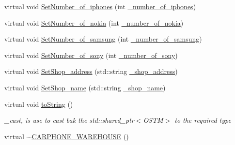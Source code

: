 \begin{DoxyCompactItemize}
\item 
virtual void \hyperlink{class_c_a_r_p_h_o_n_e___w_a_r_e_h_o_u_s_e_a167a9f9ac25b17395e5964b57099b462_a167a9f9ac25b17395e5964b57099b462}{Set\+Number\+\_\+of\+\_\+iphones} (int \hyperlink{class_c_a_r_p_h_o_n_e___w_a_r_e_h_o_u_s_e_af8f016cde9df0070da24fb8804f3d6ca_af8f016cde9df0070da24fb8804f3d6ca}{\+\_\+number\+\_\+of\+\_\+iphones})
\item 
virtual void \hyperlink{class_c_a_r_p_h_o_n_e___w_a_r_e_h_o_u_s_e_a5f2abf60f6fa8a614fadb1419bf1de83_a5f2abf60f6fa8a614fadb1419bf1de83}{Set\+Number\+\_\+of\+\_\+nokia} (int \hyperlink{class_c_a_r_p_h_o_n_e___w_a_r_e_h_o_u_s_e_a05e0c6f134857e06bdf9e6ae71eb9b4e_a05e0c6f134857e06bdf9e6ae71eb9b4e}{\+\_\+number\+\_\+of\+\_\+nokia})
\item 
virtual void \hyperlink{class_c_a_r_p_h_o_n_e___w_a_r_e_h_o_u_s_e_a179265eb31e367a082eb4048f38e602d_a179265eb31e367a082eb4048f38e602d}{Set\+Number\+\_\+of\+\_\+samsung} (int \hyperlink{class_c_a_r_p_h_o_n_e___w_a_r_e_h_o_u_s_e_a6ee4003dc7303c7df17f67a26556bdf0_a6ee4003dc7303c7df17f67a26556bdf0}{\+\_\+number\+\_\+of\+\_\+samsung})
\item 
virtual void \hyperlink{class_c_a_r_p_h_o_n_e___w_a_r_e_h_o_u_s_e_ac59a3e67850e4ce6db9f0f0d5a72d8df_ac59a3e67850e4ce6db9f0f0d5a72d8df}{Set\+Number\+\_\+of\+\_\+sony} (int \hyperlink{class_c_a_r_p_h_o_n_e___w_a_r_e_h_o_u_s_e_acf5bfebe1b5427a0b932f0cdc3b1ccdb_acf5bfebe1b5427a0b932f0cdc3b1ccdb}{\+\_\+number\+\_\+of\+\_\+sony})
\item 
virtual void \hyperlink{class_c_a_r_p_h_o_n_e___w_a_r_e_h_o_u_s_e_af26abc216ad013f1cb8ea2b3f788e048_af26abc216ad013f1cb8ea2b3f788e048}{Set\+Shop\+\_\+address} (std\+::string \hyperlink{class_c_a_r_p_h_o_n_e___w_a_r_e_h_o_u_s_e_a085b59da7d9f351043de6398b98898a7_a085b59da7d9f351043de6398b98898a7}{\+\_\+shop\+\_\+address})
\item 
virtual void \hyperlink{class_c_a_r_p_h_o_n_e___w_a_r_e_h_o_u_s_e_a832266a32b6ee4be5e531aaacb83610c_a832266a32b6ee4be5e531aaacb83610c}{Set\+Shop\+\_\+name} (std\+::string \hyperlink{class_c_a_r_p_h_o_n_e___w_a_r_e_h_o_u_s_e_a4ac330ca32a05ae4391a00db62ca6128_a4ac330ca32a05ae4391a00db62ca6128}{\+\_\+shop\+\_\+name})
\item 
virtual void \hyperlink{class_c_a_r_p_h_o_n_e___w_a_r_e_h_o_u_s_e_a4d96bb512ffcd1e0b13f632cb7fd242b_a4d96bb512ffcd1e0b13f632cb7fd242b}{to\+String} ()
\begin{DoxyCompactList}\small\item\em \+\_\+cast, is use to cast bak the std\+::shared\+\_\+ptr$<$\+O\+S\+T\+M$>$ to the required type \end{DoxyCompactList}\item 
virtual \hyperlink{class_c_a_r_p_h_o_n_e___w_a_r_e_h_o_u_s_e_ad125d83e519b6c7ca025a7e2b705c2a8_ad125d83e519b6c7ca025a7e2b705c2a8}{$\sim$\+C\+A\+R\+P\+H\+O\+N\+E\+\_\+\+W\+A\+R\+E\+H\+O\+U\+SE} ()
\end{DoxyCompactItemize}

